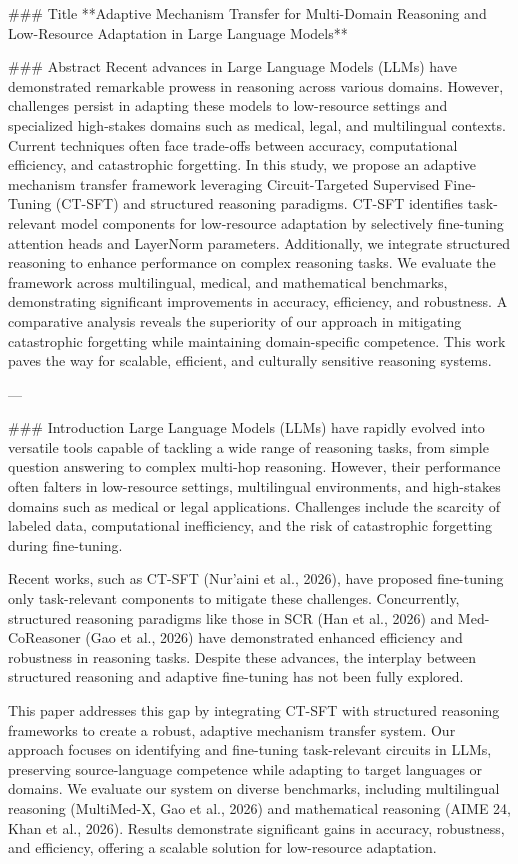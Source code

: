 ### Title
**Adaptive Mechanism Transfer for Multi-Domain Reasoning and Low-Resource Adaptation in Large Language Models**

### Abstract
Recent advances in Large Language Models (LLMs) have demonstrated remarkable prowess in reasoning across various domains. However, challenges persist in adapting these models to low-resource settings and specialized high-stakes domains such as medical, legal, and multilingual contexts. Current techniques often face trade-offs between accuracy, computational efficiency, and catastrophic forgetting. In this study, we propose an adaptive mechanism transfer framework leveraging Circuit-Targeted Supervised Fine-Tuning (CT-SFT) and structured reasoning paradigms. CT-SFT identifies task-relevant model components for low-resource adaptation by selectively fine-tuning attention heads and LayerNorm parameters. Additionally, we integrate structured reasoning to enhance performance on complex reasoning tasks. We evaluate the framework across multilingual, medical, and mathematical benchmarks, demonstrating significant improvements in accuracy, efficiency, and robustness. A comparative analysis reveals the superiority of our approach in mitigating catastrophic forgetting while maintaining domain-specific competence. This work paves the way for scalable, efficient, and culturally sensitive reasoning systems.

---

### Introduction
Large Language Models (LLMs) have rapidly evolved into versatile tools capable of tackling a wide range of reasoning tasks, from simple question answering to complex multi-hop reasoning. However, their performance often falters in low-resource settings, multilingual environments, and high-stakes domains such as medical or legal applications. Challenges include the scarcity of labeled data, computational inefficiency, and the risk of catastrophic forgetting during fine-tuning. 

Recent works, such as CT-SFT (Nur’aini et al., 2026), have proposed fine-tuning only task-relevant components to mitigate these challenges. Concurrently, structured reasoning paradigms like those in SCR (Han et al., 2026) and Med-CoReasoner (Gao et al., 2026) have demonstrated enhanced efficiency and robustness in reasoning tasks. Despite these advances, the interplay between structured reasoning and adaptive fine-tuning has not been fully explored. 

This paper addresses this gap by integrating CT-SFT with structured reasoning frameworks to create a robust, adaptive mechanism transfer system. Our approach focuses on identifying and fine-tuning task-relevant circuits in LLMs, preserving source-language competence while adapting to target languages or domains. We evaluate our system on diverse benchmarks, including multilingual reasoning (MultiMed-X, Gao et al., 2026) and mathematical reasoning (AIME 24, Khan et al., 2026). Results demonstrate significant gains in accuracy, robustness, and efficiency, offering a scalable solution for low-resource adaptation.

